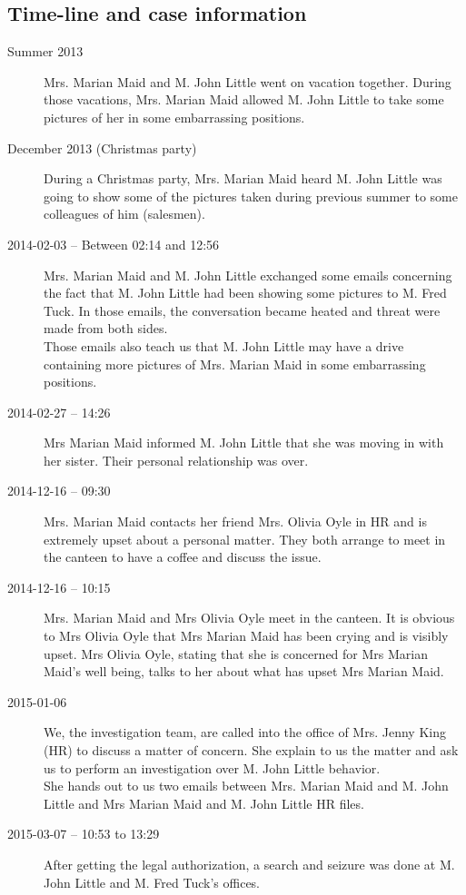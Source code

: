\subsection{Time-line and case information}
\begin{description}
 \item[Summer 2013] Mrs. Marian Maid and M. John Little went on vacation together. During those vacations, Mrs. Marian Maid allowed M. John Little to take some pictures of her in some embarrassing positions.
 \item[December 2013 (Christmas party)] During a Christmas party, Mrs. Marian Maid heard M. John Little was going to show some of the pictures taken during previous summer to some colleagues of him (salesmen).
 \item[2014-02-03 -- Between 02:14 and 12:56] Mrs. Marian Maid and M. John Little exchanged some emails concerning the fact that M. John Little had been showing some pictures to M. Fred Tuck. In those emails, the conversation became heated and threat were made from both sides.\\
 Those emails also teach us that M. John Little may have a drive containing more pictures of Mrs. Marian Maid in some embarrassing positions.
 \item[2014-02-27 -- 14:26] Mrs Marian Maid informed M. John Little that she was moving in with her sister. Their personal relationship was over. 
 \item[2014-12-16 -- 09:30] Mrs. Marian Maid contacts her friend Mrs. Olivia Oyle in HR and is extremely upset about a personal matter. They both arrange to meet in the canteen to have a coffee and discuss the issue.
 \item[2014-12-16 -- 10:15] Mrs. Marian Maid and Mrs Olivia Oyle meet in the canteen. It is obvious to Mrs Olivia Oyle that Mrs Marian Maid has been crying and is visibly upset.  Mrs Olivia Oyle, stating that she is concerned for Mrs Marian Maid's well being, talks to her about what has upset Mrs Marian Maid.
 \item[2015-01-06] We, the investigation team, are called into the office of Mrs. Jenny King (HR) to discuss a matter of concern. She explain to us the matter and ask us to perform an investigation over M. John Little behavior.\\
 She hands out to us two emails between Mrs. Marian Maid and M. John Little and Mrs Marian Maid and M. John Little HR files.
 \item[2015-03-07 -- 10:53 to 13:29] After getting the legal authorization, a search and seizure was done at M. John Little and M. Fred Tuck's offices.
\end{description}
